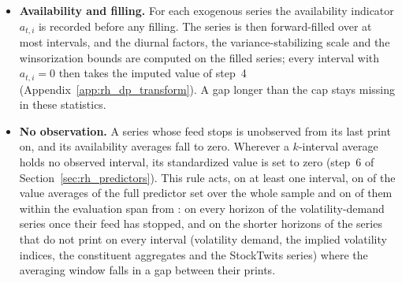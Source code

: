 \begin{itemize}
  negative value of a series that cannot be negative. The rule removes \rhdsInvalidPrints{} prints,
  \rhdsInvalidVolume{} of them zero futures volumes on intervals that carry one-minute price changes.
\item \textbf{Availability and filling.} For each exogenous series the availability indicator $a_{t,i}$ is recorded
  before any filling. The series is then forward-filled over at most \rhdsFfillCap{} intervals, and the diurnal
  factors, the variance-stabilizing scale and the winsorization bounds are computed on the filled series; every
  interval with $a_{t,i} = 0$ then takes the imputed value of step~4 (Appendix~\ref{app:rh_dp_transform}). A gap
  longer than the cap stays missing in these statistics.
\item \textbf{No observation.} A series whose feed stops is unobserved from its last print on, and its availability
  averages fall to zero. Wherever a $k$-interval average holds no observed interval, its standardized value is set to
  zero (step~6 of Section~\ref{sec:rh_predictors}). This rule acts, on at least one interval, on
  \rhdsUnobsCols{} of the \rhdsValueCols{} value averages of the full predictor set over the whole sample and on
  \rhdsUnobsColsEval{} of them within the evaluation span from \rhdsEvalStart: on every horizon of the volatility-demand
  series once their feed has stopped, and on the shorter horizons of the series that do not print on every interval
  (volatility demand, the implied volatility indices, the constituent aggregates and the StockTwits series) where the
  averaging window falls in a gap between their prints.
\end{itemize}

